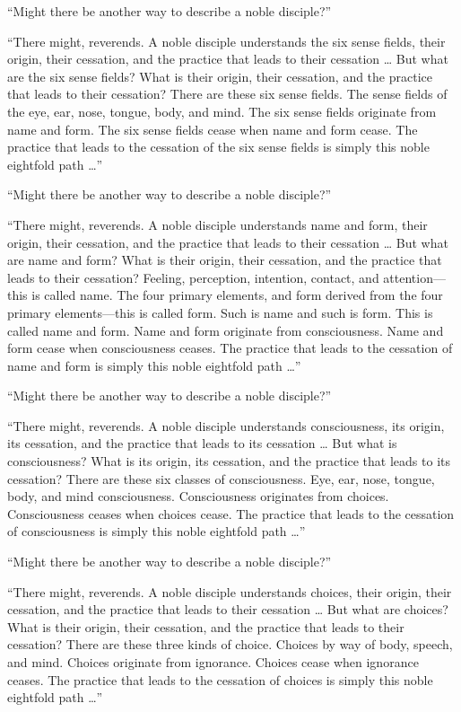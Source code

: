 \documentclass[12pt,openany]{book}%
\begin{document}
“Might there be another way to describe a noble disciple?” 

“There might, reverends. A noble disciple understands the six sense fields, their origin, their cessation, and the practice that leads to their cessation … But what are the six sense fields? What is their origin, their cessation, and the practice that leads to their cessation? There are these six sense fields. The sense fields of the eye, ear, nose, tongue, body, and mind. The six sense fields originate from name and form. The six sense fields cease when name and form cease. The practice that leads to the cessation of the six sense fields is simply this noble eightfold path …” 

“Might there be another way to describe a noble disciple?” 

“There might, reverends. A noble disciple understands name and form, their origin, their cessation, and the practice that leads to their cessation … But what are name and form? What is their origin, their cessation, and the practice that leads to their cessation? Feeling, perception, intention, contact, and attention—this is called name. The four primary elements, and form derived from the four primary elements—this is called form. Such is name and such is form. This is called name and form. Name and form originate from consciousness. Name and form cease when consciousness ceases. The practice that leads to the cessation of name and form is simply this noble eightfold path …” 

“Might there be another way to describe a noble disciple?” 

“There might, reverends. A noble disciple understands consciousness, its origin, its cessation, and the practice that leads to its cessation … But what is consciousness? What is its origin, its cessation, and the practice that leads to its cessation? There are these six classes of consciousness. Eye, ear, nose, tongue, body, and mind consciousness. Consciousness originates from choices. Consciousness ceases when choices cease. The practice that leads to the cessation of consciousness is simply this noble eightfold path …” 

“Might there be another way to describe a noble disciple?” 

“There might, reverends. A noble disciple understands choices, their origin, their cessation, and the practice that leads to their cessation … But what are choices? What is their origin, their cessation, and the practice that leads to their cessation? There are these three kinds of choice. Choices by way of body, speech, and mind. Choices originate from ignorance. Choices cease when ignorance ceases. The practice that leads to the cessation of choices is simply this noble eightfold path …” 
\end{document}
